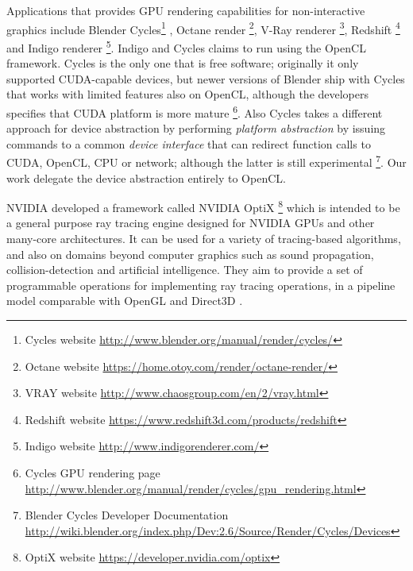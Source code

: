 \documentclass[a4paper]{sbgames}               %
\begin{document}
Applications that provides GPU rendering capabilities for
non-interactive graphics include Blender Cycles\footnote{Cycles
  website \url{http://www.blender.org/manual/render/cycles/}} , Octane
render \footnote{Octane website
  \url{https://home.otoy.com/render/octane-render/}}, V-Ray renderer
\footnote{VRAY website
  \url{http://www.chaosgroup.com/en/2/vray.html}}, Redshift
\footnote{Redshift website
  \url{https://www.redshift3d.com/products/redshift}} and Indigo
renderer \footnote{Indigo website
  \url{http://www.indigorenderer.com/}}. Indigo and Cycles claims to
run using the OpenCL framework. Cycles is the only one that is free
software; originally it only supported CUDA-capable devices, but newer
versions of Blender ship with Cycles that works with limited features
also on OpenCL, although the developers specifies that CUDA platform
is more mature \footnote{Cycles GPU rendering page
  \url{http://www.blender.org/manual/render/cycles/gpu_rendering.html}}.
Also Cycles takes a different approach for device abstraction by
performing \emph{platform abstraction} by issuing commands to a common
\emph{device interface} that can redirect function calls to CUDA,
OpenCL, CPU or network; although the latter is still experimental
\footnote{Blender Cycles Developer Documentation
  \url{http://wiki.blender.org/index.php/Dev:2.6/Source/Render/Cycles/Devices}}. Our
work delegate the device abstraction entirely to OpenCL.

NVIDIA developed a framework called NVIDIA OptiX \footnote{OptiX
  website \url{https://developer.nvidia.com/optix}} which is intended
to be a general purpose ray tracing engine designed for NVIDIA GPUs
and other many-core architectures. It can be used for a variety of
tracing-based algorithms, and also on domains beyond computer graphics
such as sound propagation, collision-detection and artificial
intelligence. They aim to provide a set of programmable operations for
implementing ray tracing operations, in a pipeline model comparable
with OpenGL and Direct3D \cite{Parker:2010:OGP:1778765.1778803}.
\end{document}
